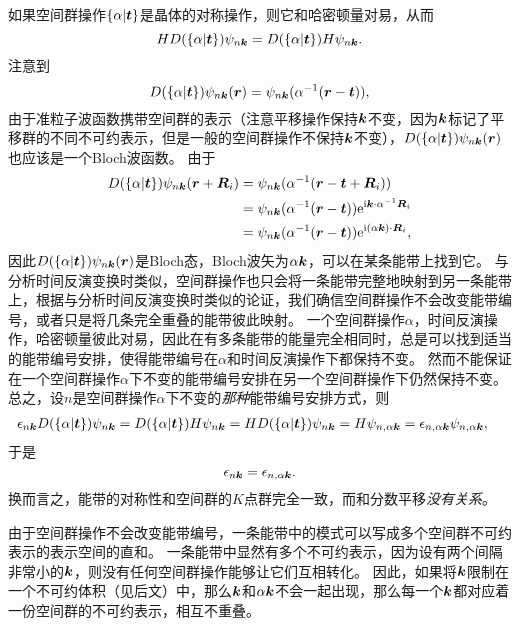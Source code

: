 如果空间群操作$\{ \alpha | \vb*{t} \}$是晶体的对称操作，则它和哈密顿量对易，从而
\[
    H D(\{ \alpha | \vb*{t} \}) \psi_{n \vb*{k}} = D(\{ \alpha | \vb*{t} \}) H \psi_{n \vb*{k}}.
\]
注意到
\[
    D(\{ \alpha | \vb*{t} \}) \psi_{n \vb*{k}} (\vb*{r}) = \psi_{n \vb*{k}} (\alpha^{-1} (\vb*{r} - \vb*{t})),
\]
由于准粒子波函数携带空间群的表示（注意平移操作保持$\vb*{k}$不变，因为$\vb*{k}$标记了平移群的不同不可约表示，但是一般的空间群操作不保持$\vb*{k}$不变），$D(\{ \alpha | \vb*{t} \}) \psi_{n \vb*{k}} (\vb*{r})$也应该是一个Bloch波函数。
由于
\[
    \begin{aligned}
        D(\{ \alpha | \vb*{t} \}) \psi_{n \vb*{k}} (\vb*{r} + \vb*{R}_i) &= \psi_{n \vb*{k}} (\alpha^{-1} (\vb*{r} - \vb*{t} + \vb*{R}_i)) \\
        &= \psi_{n \vb*{k}} (\alpha^{-1} (\vb*{r} - \vb*{t})) \mathrm{e}^{\mathrm{i} \vb*{k} \cdot \alpha^{-1} \vb*{R}_i} \\
        &= \psi_{n \vb*{k}} (\alpha^{-1} (\vb*{r} - \vb*{t})) \mathrm{e}^{\mathrm{i} (\alpha \vb*{k}) \cdot \vb*{R}_i} ,
    \end{aligned}
\]
因此$D(\{ \alpha | \vb*{t} \}) \psi_{n \vb*{k}} (\vb*{r})$是Bloch态，Bloch波矢为$\alpha \vb*{k}$，可以在某条能带上找到它。
与分析时间反演变换时类似，空间群操作也只会将一条能带完整地映射到另一条能带上，根据与分析时间反演变换时类似的论证，我们确信空间群操作不会改变能带编号，或者只是将几条完全重叠的能带彼此映射。
一个空间群操作$\alpha$，时间反演操作，哈密顿量彼此对易，因此在有多条能带的能量完全相同时，总是可以找到适当的能带编号安排，使得能带编号在$\alpha$和时间反演操作下都保持不变。
然而不能保证在一个空间群操作$\alpha$下不变的能带编号安排在另一个空间群操作下仍然保持不变。
总之，设$n$是空间群操作$\alpha$下不变的\emph{那种}能带编号安排方式，则
\[
    \begin{aligned}
        \epsilon_{n \vb*{k}} D(\{\alpha | \vb*{t}\}) \psi_{n \vb*{k}} &= D(\{ \alpha | \vb*{t} \}) H \psi_{n \vb*{k}} = H D(\{ \alpha | \vb*{t} \}) \psi_{n \vb*{k}} = H \psi_{n, \alpha \vb*{k}} = \epsilon_{n, \alpha \vb*{k}} \psi_{n, \alpha \vb*{k}},
    \end{aligned}
\]
于是
\begin{equation}
    \epsilon_{n \vb*{k}} = \epsilon_{n, \alpha \vb*{k}}.
\end{equation}
换而言之，能带的对称性和空间群的$K$点群完全一致，而和分数平移\emph{没有关系}。

由于空间群操作不会改变能带编号，一条能带中的模式可以写成多个空间群不可约表示的表示空间的直和。
一条能带中显然有多个不可约表示，因为设有两个间隔非常小的$\vb*{k}$，则没有任何空间群操作能够让它们互相转化。
因此，如果将$\vb*{k}$限制在一个不可约体积（见后文）中，那么$\vb*{k}$和$\alpha \vb*{k}$不会一起出现，那么每一个$\vb*{k}$都对应着一份空间群的不可约表示，相互不重叠。

